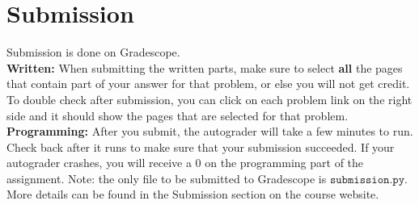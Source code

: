 \documentclass{article}
\theoremstyle{case}
\theoremstyle{definition}
\begin{document}
\newpage

\section*{Submission}

Submission is done on Gradescope. \\

\textbf{Written:} When submitting the written parts, make sure to select \textbf{all} the pages that contain part of your answer for that problem, or else you will not get credit.
To double check after submission, you can click on each problem link on the right side and it should show the pages that are selected for that problem. \\

\textbf{Programming:} After you submit, the autograder will take a few minutes to run. Check back after it runs to make sure that your submission succeeded. If your autograder crashes, you will receive a 0 on the programming part of the assignment. Note: the only file to be submitted to Gradescope is $\texttt{submission.py}$.\\

More details can be found in the Submission section on the course website.
\end{document}
